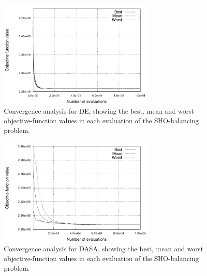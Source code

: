 \begin{figure}[H]
\centering

\includegraphics[width=0.7\textwidth]{07-experimental_evaluation-sho_balancing/img/DE_convergence}

\caption{Convergence analysis for DE, showing the best, mean and worst objective-function
values in each evaluation of the SHO-balancing problem.\label{fig:07-Algorithm_convergence-DE}}
\end{figure}


\begin{figure}[h]
\centering

\includegraphics[width=0.7\textwidth]{07-experimental_evaluation-sho_balancing/img/DASA_convergence}

\caption{Convergence analysis for DASA, showing the best, mean and worst objective-function
values in each evaluation of the SHO-balancing problem.\label{fig:07-Algorithm_convergence-DASA}}
\end{figure}


